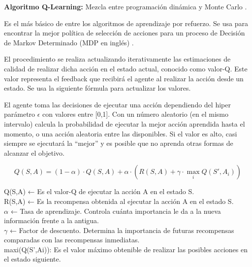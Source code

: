 \noindent \textbf{Algoritmo Q-Learning:} Mezcla entre programación dinámica y Monte Carlo \cite{wang2012monte}.

Es el más básico de entre los algoritmos de aprendizaje por refuerzo. Se usa para encontrar la mejor política de selección de acciones para un proceso de Decisión de Markov Determinado (MDP en inglés) \cite{garcia2013markov}. 

El procedimiento se realiza actualizando iterativamente las estimaciones de calidad de realizar dicha acción en el estado actual, conocido como valor-Q. Este valor representa el feedback que recibirá el agente al realizar la acción desde un estado. Se usa la siguiente fórmula para actualizar los valores.

El agente toma las decisiones de ejecutar una acción dependiendo del hiper parámetro $\epsilon$  con valores entre [0,1]. Con un número aleatorio (en el mismo intervalo) calcula la probabilidad de ejecutar la mejor acción aprendida hasta el momento, o una acción aleatoria entre las disponibles. Si el valor es alto, casi siempre se ejecutará la “mejor” y es posible que no aprenda otras formas de alcanzar el objetivo.



\begin{flushleft}
	\begin{mdframed}[roundcorner=5pt]
		\[
		Q(S,A) = (1-\alpha) \cdot Q(S,A) + \alpha \cdot \left(R(S,A) + \gamma \cdot \max_{i} Q(S',A_i)\right)
		\]
		\begin{tcolorbox}[boxrule=0.5pt, fontupper=\small]
			\scriptsize
			Q(S,A) ← Es el valor-Q de ejecutar la acción A en el estado S.\\
			R(S,A) ← Es la recompensa obtenida al ejecutar la acción A en el estado S.\\
			$\alpha$ ← Tasa de aprendizaje. Controla cuánta importancia le da a la nueva información frente a la antigua.\\
			$\gamma$ ← Factor de descuento. Determina la importancia de futuras recompensas comparadas con las recompensas inmediatas.\\
			maxi(Q(S’,Ai)): Es el valor máximo obtenible de realizar las posibles acciones en el estado siguiente.
			
			
		\end{tcolorbox}
		
	\end{mdframed}
\end{flushleft}


